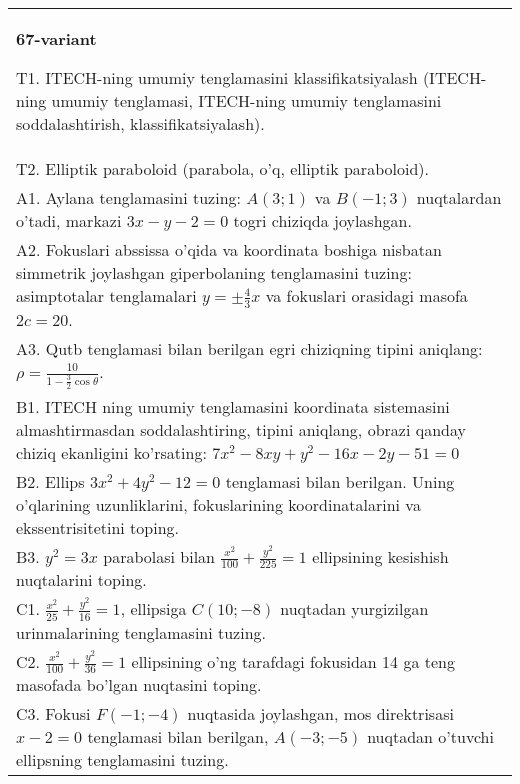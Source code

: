 \documentclass{article}
\begin{document}
\begin{tabular}{m{17cm}}
\textbf{67-variant}
\newline

T1. ITECH-ning umumiy tenglamasini klassifikatsiyalash (ITECH-ning umumiy tenglamasi, ITECH-ning umumiy tenglamasini soddalashtirish, klassifikatsiyalash).\\

T2. Elliptik paraboloid (parabola, o'q, elliptik paraboloid).\\

A1. Aylana tenglamasini tuzing: $A(3;1)$ va $B(-1;3)$ nuqtalardan o'tadi, markazi $3x-y-2=0$ togri chiziqda joylashgan.\\

A2. Fokuslari abssissa o'qida va koordinata boshiga nisbatan simmetrik joylashgan giperbolaning tenglamasini tuzing: asimptotalar tenglamalari $y=\pm \frac{4}{3}x$ va fokuslari orasidagi masofa $2c=20$.\\

A3. Qutb tenglamasi bilan berilgan egri chiziqning tipini aniqlang: $\rho=\frac{10}{1-\frac{3}{2}\cos\theta}$.\\

B1. ITECH ning umumiy tenglamasini koordinata sistemasini almashtirmasdan soddalashtiring, tipini aniqlang, obrazi qanday chiziq ekanligini ko'rsating: $7x^{2} - 8xy + y^{2} - 16x - 2y - 51 = 0$\\

B2. Ellips $3x^{2} + 4y^{2} - 12 = 0$ tenglamasi bilan berilgan. Uning o'qlarining uzunliklarini, fokuslarining koordinatalarini va ekssentrisitetini toping.  \\

B3. $y^{2} = 3x$ parabolasi bilan $\frac{x^{2}}{100} + \frac{y^{2}}{225} = 1$ ellipsining kesishish nuqtalarini toping.  \\

C1. $\frac{x^{2}}{25} + \frac{y^{2}}{16} = 1$, ellipsiga $C(10; - 8)$ nuqtadan yurgizilgan urinmalarining tenglamasini tuzing.  \\

C2. $\frac{x^{2}}{100} + \frac{y^{2}}{36} = 1$ ellipsining o'ng tarafdagi fokusidan 14 ga teng masofada bo'lgan nuqtasini toping.  \\

C3. Fokusi $F( - 1; - 4)$ nuqtasida joylashgan, mos direktrisasi $x - 2 = 0$ tenglamasi bilan berilgan, $A( - 3; - 5)$ nuqtadan o'tuvchi ellipsning tenglamasini tuzing.  \\

\end{tabular}
\vspace{1cm}
\end{document}
